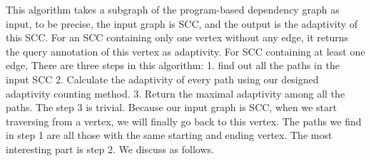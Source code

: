 This algorithm takes a subgraph of the program-based dependency graph as input, to be precise, the input graph is SCC, and the output is the adaptivity of this SCC. 
For an SCC containing only one vertex without any edge, it returns the query annotation of this vertex as adaptivity.
For SCC containing at least one edge, 
There are three steps in this algorithm: 1. find out all the paths in the input SCC 2. Calculate the adaptivity of every path using our designed adaptivity counting method. 3. Return the maximal adaptivity among all the paths. The step 3 is trivial. Because our input graph is SCC, when we start traversing from a vertex, we will finally go back to this vertex. The paths we find in step 1 are all those with the same starting and ending vertex. The most interesting part is step 2. 
We discuss as follows.

